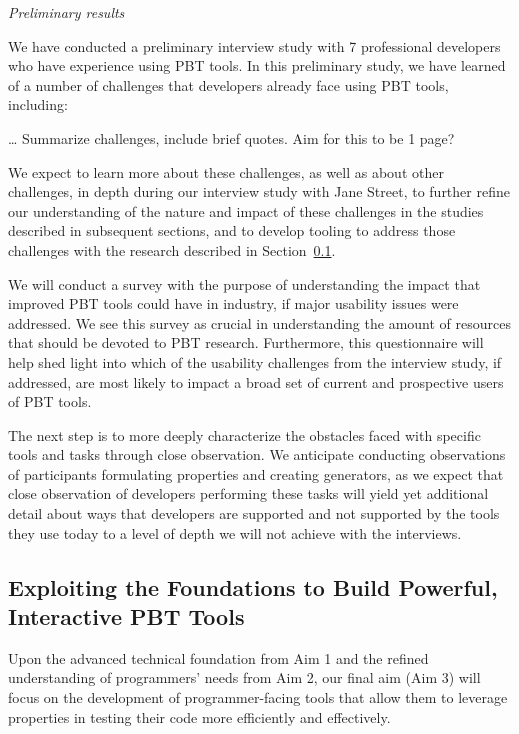 \textit{Preliminary results}

We have conducted a preliminary interview study with 7 professional developers
who have experience using PBT tools. In this preliminary study, we have learned
of a number of challenges that developers already face using PBT tools, including:

\ldots{} Summarize challenges, include brief quotes. Aim for this to be 1 page?

We expect to learn more about these challenges, as well as about other challenges,
in depth during our interview study with Jane Street, to further refine our
understanding of the nature and impact of these challenges in the studies
described in subsequent sections, and to develop tooling to address
those challenges with the research described in Section~\ref{sec:tools}.


We will conduct a survey with the purpose of understanding the impact that
improved PBT tools could have in industry, if major usability issues were
addressed. We see this survey as crucial in understanding the amount of
resources that should be devoted to PBT research. Furthermore, this
questionnaire will help shed light into which of the usability challenges from
the interview study, if addressed, are most likely to impact a broad set of
current and prospective users of PBT tools.


The next step is to more deeply characterize the obstacles faced with specific
tools and tasks through close observation. We anticipate conducting observations
of participants formulating properties and creating generators, as we expect
that close observation of developers performing these tasks will yield yet
additional detail about ways that developers are supported and not supported by
the tools they use today to a level of depth we will not achieve with the
interviews.

\subsection{Exploiting the Foundations to Build Powerful, Interactive PBT Tools }
\label{sec:tools}

Upon the advanced technical foundation from Aim 1 and the refined understanding
of programmers' needs from Aim 2, our final aim (Aim 3) will focus on the
development of programmer-facing tools that allow them to leverage properties in
testing their code more efficiently and effectively.

